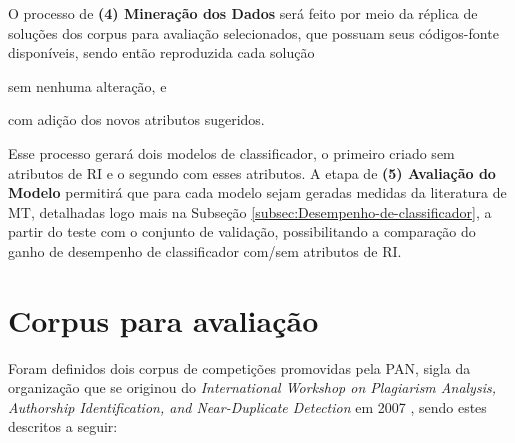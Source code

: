     O processo de \textbf{(4) Mineração dos Dados} será feito por meio da réplica de soluções dos corpus para avaliação selecionados, que possuam seus códigos-fonte disponíveis, sendo então reproduzida cada solução 
    \begin{enumerate*}[label=(\alph*)]
        \item sem nenhuma alteração, e 
        \item com adição dos novos atributos sugeridos.
    \end{enumerate*}
    Esse processo gerará dois modelos de classificador, o primeiro criado sem atributos de RI e o segundo com esses atributos.
    A etapa de \textbf{(5) Avaliação do Modelo} permitirá que para cada modelo sejam geradas medidas da literatura de MT, detalhadas logo mais na Subseção \ref{subsec:Desempenho-de-classificador}, a partir do teste com o conjunto de validação, possibilitando a comparação do ganho de desempenho de classificador com/sem atributos de RI.

\section{Corpus para avaliação}  \label{sec:Corpus-para-avaliação}
    Foram definidos dois corpus de competições promovidas pela PAN, sigla da organização que se originou do \textit{International Workshop on Plagiarism Analysis, Authorship Identification, and Near-Duplicate Detection} em 2007 \cite{PAN_Workshop_2007}, sendo estes descritos a seguir:


